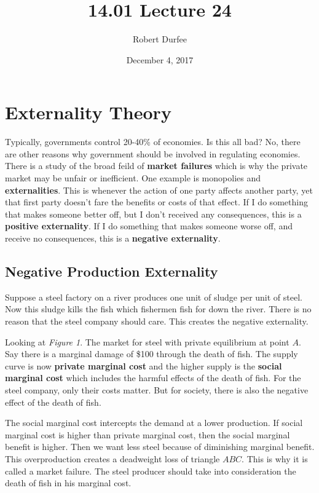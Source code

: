 \documentclass{article}
\title{ 14.01 Lecture 24 }
\author{ Robert Durfee }
\date{ December 4, 2017 }
\begin{document}
\maketitle

\section{ Externality Theory }

Typically, governments control 20-40\% of economies. Is this all bad? No, there
are other reasons why government should be involved in regulating economies.
There is a study of the broad feild of \textbf{market failures} which is why
the private market may be unfair or inefficient. One example is monopolies and
\textbf{externalities}. This is whenever the action of one party affects another
party, yet that first party doesn't fare the benefits or costs of that effect.
If I do something that makes someone better off, but I don't received any
consequences, this is a \textbf{positive externality}. If I do something that
makes someone worse off, and receive no consequences, this is a \textbf{negative
externality}.

\subsection{ Negative Production Externality }

Suppose a steel factory on a river produces one unit of sludge per unit of
steel. Now this sludge kills the fish which fishermen fish for down the river.
There is no reason that the steel company should care. This creates the negative
externality. 

Looking at \textit{Figure 1}. The market for steel with private equilibrium at
point $A$. Say there is a marginal damage of \$100 through the death of fish.
The supply curve is now \textbf{private marginal cost} and the higher supply is
the \textbf{social marginal cost} which includes the harmful effects of the
death of fish. For the steel company, only their costs matter. But for society,
there is also the negative effect of the death of fish. 

The social marginal cost intercepts the demand at a lower production. If social
marginal cost is higher than private marginal cost, then the social marginal
benefit is higher. Then we want less steel because of diminishing marginal
benefit. This overproduction creates a deadweight loss of triangle $ABC$. This
is why it is called a market failure. The steel producer should take into
consideration the death of fish in his marginal cost.
\end{document}
